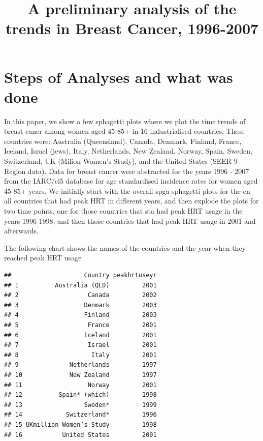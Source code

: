 \documentclass{article}\usepackage[]{graphicx}\usepackage[]{color}
\title{A preliminary analysis of the trends in Breast Cancer, 1996-2007}
\author{}
\makeatletter
\newenvironment{kframe}{%
 \def\at@end@of@kframe{}%
 \ifinner\ifhmode%
  \def\at@end@of@kframe{\end{minipage}}%
  \begin{minipage}{\columnwidth}%
 \fi\fi%
 \def\FrameCommand##1{\hskip\@totalleftmargin \hskip-\fboxsep
 \colorbox{shadecolor}{##1}\hskip-\fboxsep
     \hskip-\linewidth \hskip-\@totalleftmargin \hskip\columnwidth}%
 \MakeFramed {\advance\hsize-\width
   \@totalleftmargin\z@ \linewidth\hsize
   \@setminipage}}%
 {\par\unskip\endMakeFramed%
 \at@end@of@kframe}
\newenvironment{knitrout}{}{} %
\makeatother
\begin{document}
\maketitle

\section*{Steps of Analyses and what was done}

In this paper, we show a few sphagetti plots where we plot the time trends of breast caner among women aged 45-85+ in 16 industrialised countries. These countries were: Australia (Queensland), Canada, Denmark, Finland, France, Iceland, Israel (jews), Italy, Netherlands, New Zealand, Norway, Spain, Sweden, Switzerland, UK (Milion Women's Study), and the United States (SEER 9 Region data). Data for breast cancer were abstracted for the years 1996 - 2007 from the IARC/ci5 database for age standardised incidence rates for women aged 45-85+ years. We initially start with the overall spga sphagetti plots for the en all countries that had peak HRT in different years, and then explode the plots for two time points, one for those countries that sta had peak HRT usage in the years 1996-1998, and then those countries that had peak HRT usage in 2001 and afterwards.



The following chart shows the names of the countries and the year when they reached peak HRT usage

\begin{knitrout}
\color{fgcolor}\begin{kframe}
\begin{verbatim}
##                    Country peakhrtuseyr
## 1          Australia (QLD)         2001
## 2                   Canada         2002
## 3                  Denmark         2003
## 4                  Finland         2003
## 5                   France         2001
## 6                  Iceland         2001
## 7                   Israel         2001
## 8                    Italy         2001
## 9              Netherlands         1997
## 10             New Zealand         1997
## 11                  Norway         2001
## 12          Spain* (which)         1998
## 13                 Sweden*         1999
## 14            Switzerland*         1996
## 15 UKmillion Women’s Study         1998
## 16           United States         2001
\end{verbatim}
\end{kframe}
\end{knitrout}
\end{document}
